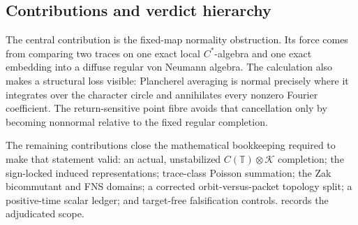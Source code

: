\documentclass[11pt]{article}
\theoremstyle{definition}
\newcommand{\T}{\mathbb{T}}
\newcommand{\K}{\mathcal{K}}
\begin{document}
\subsection{Contributions and verdict hierarchy}

The central contribution is the fixed-map normality obstruction.  Its force comes from comparing two traces on one exact local \(C^*\)-algebra and one exact embedding into a diffuse regular von Neumann algebra.  The calculation also makes a structural loss visible: Plancherel averaging is normal precisely where it integrates over the character circle and annihilates every nonzero Fourier coefficient.  The return-sensitive point fibre avoids that cancellation only by becoming nonnormal relative to the fixed regular completion.

The remaining contributions close the mathematical bookkeeping required to make that statement valid: an actual, unstabilized \(C(\T)\otimes\K\) completion; the sign-locked induced representations; trace-class Poisson summation; the Zak bicommutant and FNS domains; a corrected orbit-versus-packet topology split; a positive-time scalar ledger; and target-free falsification controls.   records the adjudicated scope.
\end{document}
